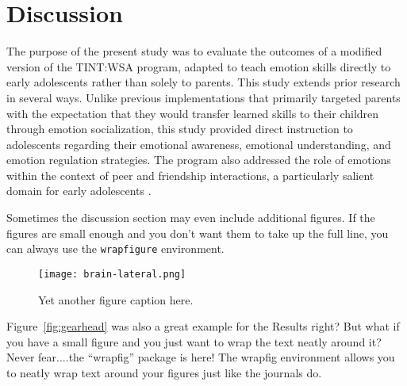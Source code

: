 \section{Discussion}

The purpose of the present study was to evaluate the outcomes of a modified version of the TINT:WSA program, adapted to teach emotion skills directly to early adolescents rather than solely to parents. This study extends prior research in several ways. Unlike previous implementations that primarily targeted parents with the expectation that they would transfer learned skills to their children through emotion socialization, this study provided direct instruction to adolescents regarding their emotional awareness, emotional understanding, and emotion regulation strategies. The program also addressed the role of emotions within the context of peer and friendship interactions, a particularly salient domain for early adolescents . 

Sometimes the discussion section may even include additional figures.  If the figures are small enough and you don't want them to take up the full line, you can always use the \texttt{wrapfigure} environment.

\begin{wrapfigure}{l}{0.4\textwidth}     \centering       
\texttt{[image: brain-lateral.png]}
\caption{\label{fig:latbrain} Yet another figure caption here.}
\end{wrapfigure}

Figure~\ref{fig:gearhead} was also a great example for the Results right? But what if you have a small figure and you just want to wrap the text neatly around it?  Never fear....the ``wrapfig'' package is here! The wrapfig environment allows you to neatly wrap text around your figures just like the journals do. \blindtext
